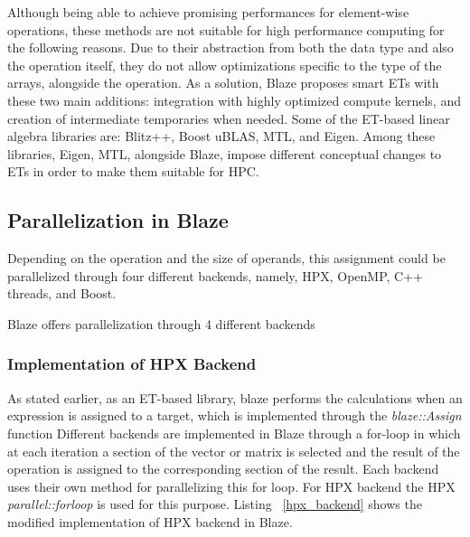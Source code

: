 Although being able to achieve promising performances for element-wise operations, these methods are not suitable for high performance computing for the following reasons. Due to their abstraction from both the data type and also the operation itself, they do not allow optimizations specific to the type of the arrays, alongside the operation\cite{iglberger2012expression}. As a solution, Blaze proposes smart ETs with these two main additions: integration with highly optimized compute kernels, and creation of intermediate temporaries when needed\cite{iglberger2012expression}. 
Some of the ET-based linear algebra libraries are: Blitz++\cite{Blitz}, Boost uBLAS\cite{ublas}, MTL\cite{MTL}, and Eigen\cite{guennebaud2010eigen}. Among these libraries, Eigen, MTL, alongside Blaze, impose different conceptual changes to ETs in order to make them suitable for HPC.    


\subsection{Parallelization in Blaze}
Depending on the operation and the size of operands, this assignment could be parallelized through four different backends, namely, HPX, OpenMP\cite{dagum1998openmp}, C++ threads, and Boost\cite{Boost}. 

Blaze offers parallelization through 4 different backends

\subsubsection{Implementation of HPX Backend}
As stated earlier, as an ET-based library, blaze performs the calculations when an expression is assigned to a target, which is implemented through the \textit{blaze::Assign} function
Different backends are implemented in Blaze through a for-loop in which at each iteration a section of the vector or matrix is selected and the result of the operation is assigned to the corresponding section of the result. 
Each backend uses their own method for parallelizing this for loop. For HPX backend the HPX \textit{parallel::for\textunderscore loop} is used for this purpose. 
Listing ~\ref{hpx_backend} shows the modified implementation of HPX backend in Blaze.



